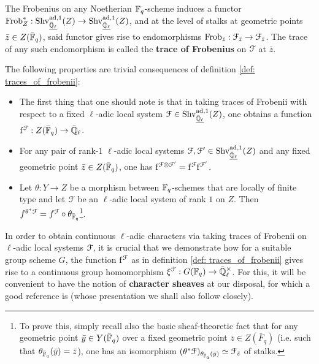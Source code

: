             \begin{definition} \label{def: traces_of_frobenii}
                The Frobenius on any Noetherian $\mathbb{F}_q$-scheme induces a functor $\mathrm{Frob}_Z^*: \mathrm{Shv}_{\underline{\bar{\mathbb{Q}}_{\ell}}}^{\mathrm{ad}, 1}(Z) \to \mathrm{Shv}_{\underline{\bar{\mathbb{Q}}_{\ell}}}^{\mathrm{ad}, 1}(Z)$, and at the level of stalks at geometric points $\bar{z} \in Z(\bar{\mathbb{F}}_q)$, said functor gives rise to endomorphisms $\mathrm{Frob}_{\bar{z}}: \mathcal{F}_{\bar{z}} \to \mathcal{F}_{\bar{z}}$. The trace of any such endomorphism is called the \textbf{trace of Frobenius} on $\mathcal{F}$ at $\bar{z}$.
            \end{definition}
            \begin{remark} \label{remark: basic_properties_of_traces_of_frobenii}
                The following properties are trivial consequences of definition \ref{def: traces_of_frobenii}:
                    \begin{itemize}
                        \item The first thing that one should note is that in taking traces of Frobenii with respect to a fixed $\ell$-adic local system $\mathcal{F} \in \mathrm{Shv}_{\underline{\bar{\mathbb{Q}}_{\ell}}}^{\mathrm{ad}, 1}(Z)$, one obtains a function $\mathrm{f}^{\mathcal{F}}: Z(\bar{\mathbb{F}}_q) \to \bar{\mathbb{Q}}_{\ell}$.
                        \item For any pair of rank-$1$ $\ell$-adic local systems $\mathcal{F}, \mathcal{F}' \in \mathrm{Shv}_{\underline{\bar{\mathbb{Q}}_{\ell}}}^{\mathrm{ad}, 1}(Z)$ and any fixed geometric point $\bar{z} \in Z(\bar{\mathbb{F}}_q)$, one has $\frob^{\calF \tensor \calF'} = \frob^{\calF} \frob^{\calF'}$.
                        \item Let $\theta: Y \to Z$ be a morphism between $\mathbb{F}_q$-schemes that are locally of finite type and let $\mathcal{F}$ be an $\ell$-adic local system of rank $1$ on $Z$. Then $f^{\theta^*\mathcal{F}} = f^{\mathcal{F}} \circ \theta_{\bar{\mathbb{F}}_q}$\footnote{To prove this, simply recall also the basic sheaf-theoretic fact that for any geometric point $\bar{y} \in Y(\bar{\mathbb{F}}_q)$ over a fixed geometric point $\bar{z} \in Z(\bar{F}_q)$ (i.e. such that $\theta_{\bar{\mathbb{F}}_q}(\bar{y}) = \bar{z}$), one has an isomorphism $(\theta^*\mathcal{F})_{\theta_{\bar{\mathbb{F}}_q}(\bar{y})} \simeq \mathcal{F}_{\bar{z}}$ of stalks.}.
                    \end{itemize}
            \end{remark}
            
            In order to obtain continuous $\ell$-adic characters via taking traces of Frobenii on $\ell$-adic local systems $\mathcal{F}$, it is crucial that we demonstrate how for a suitable group scheme $G$, the function $\mathrm{f}^{\mathcal{F}}$ as in definition \ref{def: traces_of_frobenii} gives rise to a continuous group homomorphism $\xi^{\calF}: G(\F_q) \to \bar{\Q}_{\ell}^{\x}$. For this, it will be convenient to have the notion of \textbf{character sheaves} at our disposal, for which a good reference is \cite{cunningham_roe_function_sheaf_dictionary_quasi_characters_p_adic_tori} (whose presentation we shall also follow closely). 
            
